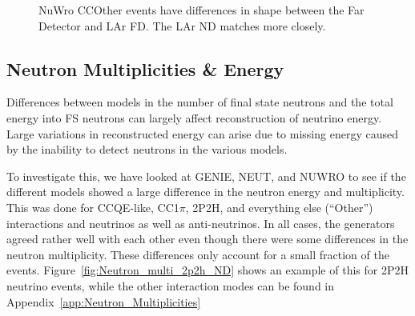 \documentclass[12pt]{article}
\begin{document}
\begin{figure}[h]
\endminipage
\caption{NuWro CCOther events have differences in shape between the Far Detector and LAr FD. The LAr ND matches more closely.}
\label{fig:numubar_Etrue_ereco_CCOther_diffs}
\end{figure}
\FloatBarrier




\subsection{Neutron Multiplicities \& Energy}
\label{sec:N_multiplicities_Energy}

Differences between models in the number of final state neutrons and the total energy into FS neutrons can largely affect reconstruction of neutrino energy. Large variations in reconstructed energy can arise due to missing energy caused by the inability to detect neutrons in the various models.  

To investigate this, we have looked at GENIE, NEUT, and NUWRO to see if the different models showed a large difference in the neutron energy and multiplicity.  
This was done for CCQE-like, CC1$\pi$, 2P2H, and everything else (``Other'') interactions and neutrinos as well as anti-neutrinos.  
In all cases, the generators agreed rather well with each other even though there were some differences in the neutron multiplicity. 
These differences only account for a small fraction of the events.
Figure~\ref{fig:Neutron_multi_2p2h_ND} shows an example of this for 2P2H neutrino events, while the other interaction modes can be found in Appendix~\ref{app:Neutron_Multiplicities}
  
\end{document}
